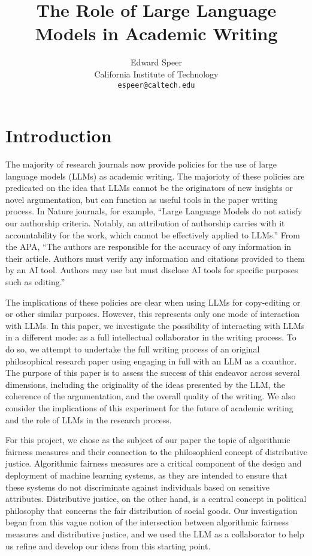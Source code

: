\documentclass[11pt, a4paper, hyphens]{article}
\title{The Role of Large Language Models in Academic Writing}
\author{%
  Edward Speer
  \\
  California Institute of Technology\\
  \texttt{espeer@caltech.edu} \\
}
\date{\monthyeardate}
\begin{document}
\maketitle

\section{Introduction}\label{sec:introduction}

The majority of research journals now provide policies for the use of large
language models (LLMs) as academic writing. The majorioty of these policies are
predicated on the idea that LLMs cannot be the originators of new insights or
novel argumentation, but can function as useful tools in the paper writing
process. In Nature journals, for example, ``Large Language Models do not
satisfy our authorship criteria. Notably, an attribution of authorship carries 
with it accountability for the work, which cannot be effectively applied to
LLMs.'' From the APA, ``The authors are responsible for the accuracy of any
information in their article. Authors must verify any information and citations
provided to them by an AI tool. Authors may use but must disclose AI tools for
specific purposes such as editing.''

The implications of these policies are clear when using LLMs for copy-editing or
or other similar purposes. However, this represents only one mode of interaction
with LLMs. In this paper, we investigate the possibility of interacting with
LLMs in a different mode: as a full intellectual collaborator in the writing
process. To do so, we attempt to undertake the full writing process of an
original philosophical research paper using engaging in full with an LLM as a
coauthor. The purpose of this paper is to assess the success of this endeavor
across several dimensions, including the originality of the ideas presented by
the LLM, the coherence of the argumentation, and the overall quality of the
writing. We also consider the implications of this experiment for the future of
academic writing and the role of LLMs in the research process.

For this project, we chose as the subject of our paper the topic of algorithmic
fairness measures and their connection to the philosophical concept of
distributive justice. Algorithmic fairness measures are a critical component of
the design and deployment of machine learning systems, as they are intended to
ensure that these systems do not discriminate against individuals based on
sensitive attributes. Distributive justice, on the other hand, is a central
concept in political philosophy that concerns the fair distribution of social
goods. Our investigation began from this vague notion of the intersection
between algorithmic fairness measures and distributive justice, and we used the
LLM as a collaborator to help us refine and develop our ideas from this starting
point.
\end{document}
